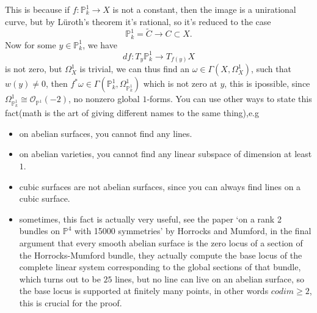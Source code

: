 \documentclass[../main.tex]{subfiles}
\begin{document}
\begin{remark}
This is because if $f:\mathbb{P}_{k}^{1}\rightarrow X$ is not a constant, then the image is a unirational curve, but by Lüroth's theorem it's rational, so it's reduced to the case $$\mathbb{P}_{k}^{1}=\widetilde{C}\rightarrow C\subset X.$$
Now for some $y\in \mathbb{P}_{k}^{1}$, we have 
$$df: T_{y}\mathbb{P}_{k}^{1}\rightarrow T_{f(y)}X$$
is not zero, but $\Omega_{X}^{1}$ is trivial, we can thus find an $\omega\in \Gamma(X,\Omega_{X}^{1})$, such that $w(y)\neq 0$, then $f^{*}\omega\in \Gamma(\mathbb{P}_{k}^{1},\Omega_{\mathbb{P}_{k}^{1}}^{1})$
which is not zero at $y$, this is ipossible, since $\Omega_{\mathbb{P}_{k}^{1}}^{1}\cong \mathcal{O}_{\mathbb{P}^{1}}(-2)$, no nonzero global $1$-forms. You can use other ways to state this fact(math is the art of giving different names to the same thing),e.g 
\begin{itemize}
\item on abelian surfaces, you cannot find any lines.
\item on abelian varieties, you cannot find any linear subspace of dimension at least $1$.
\item cubic surfaces are not abelian surfaces, since you can always find lines on a cubic surface.
\item sometimes, this fact is actually very useful, see the paper `on a rank 2 bundles on $\mathbb{P}^{4}$ with 15000 symmetries' by Horrocks and Mumford, in the final argument that every smooth abelian surface is the zero locus of a section of the Horrocks-Mumford bundle, they actually compute the base locus of the complete linear system  corresponding to the global sections of that bundle, which turns out to be $25$ lines, but no line can live on an abelian surface, so the base locus is supported at finitely many points, in other words $codim\geq 2$, this is crucial for the proof.
\end{itemize} 
\end{remark}
\end{document}
